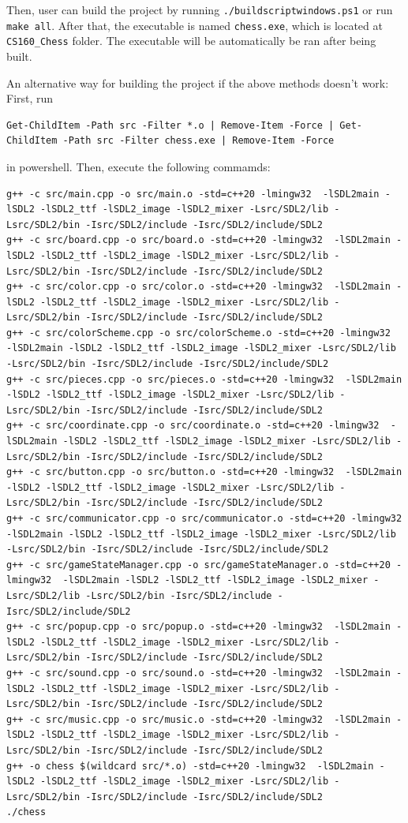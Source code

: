 \documentclass[a4paper, 10pt, titlepage]{report}
\begin{document}
Then, user can build the project by running \texttt{./buildscriptwindows.ps1} or run \texttt{make all}. After that, the executable is named \texttt{chess.exe}, which is located at \texttt{CS160\_Chess} folder. The executable will be automatically be ran after being built.

An alternative way for building the project if the above methods doesn't work:
First, run \begin{lstlisting}
Get-ChildItem -Path src -Filter *.o | Remove-Item -Force | Get-ChildItem -Path src -Filter chess.exe | Remove-Item -Force
\end{lstlisting} in powershell.
Then, execute the following commamds:
\begin{lstlisting}
g++ -c src/main.cpp -o src/main.o -std=c++20 -lmingw32  -lSDL2main -lSDL2 -lSDL2_ttf -lSDL2_image -lSDL2_mixer -Lsrc/SDL2/lib -Lsrc/SDL2/bin -Isrc/SDL2/include -Isrc/SDL2/include/SDL2
g++ -c src/board.cpp -o src/board.o -std=c++20 -lmingw32  -lSDL2main -lSDL2 -lSDL2_ttf -lSDL2_image -lSDL2_mixer -Lsrc/SDL2/lib -Lsrc/SDL2/bin -Isrc/SDL2/include -Isrc/SDL2/include/SDL2
g++ -c src/color.cpp -o src/color.o -std=c++20 -lmingw32  -lSDL2main -lSDL2 -lSDL2_ttf -lSDL2_image -lSDL2_mixer -Lsrc/SDL2/lib -Lsrc/SDL2/bin -Isrc/SDL2/include -Isrc/SDL2/include/SDL2
g++ -c src/colorScheme.cpp -o src/colorScheme.o -std=c++20 -lmingw32  -lSDL2main -lSDL2 -lSDL2_ttf -lSDL2_image -lSDL2_mixer -Lsrc/SDL2/lib -Lsrc/SDL2/bin -Isrc/SDL2/include -Isrc/SDL2/include/SDL2
g++ -c src/pieces.cpp -o src/pieces.o -std=c++20 -lmingw32  -lSDL2main -lSDL2 -lSDL2_ttf -lSDL2_image -lSDL2_mixer -Lsrc/SDL2/lib -Lsrc/SDL2/bin -Isrc/SDL2/include -Isrc/SDL2/include/SDL2
g++ -c src/coordinate.cpp -o src/coordinate.o -std=c++20 -lmingw32  -lSDL2main -lSDL2 -lSDL2_ttf -lSDL2_image -lSDL2_mixer -Lsrc/SDL2/lib -Lsrc/SDL2/bin -Isrc/SDL2/include -Isrc/SDL2/include/SDL2
g++ -c src/button.cpp -o src/button.o -std=c++20 -lmingw32  -lSDL2main -lSDL2 -lSDL2_ttf -lSDL2_image -lSDL2_mixer -Lsrc/SDL2/lib -Lsrc/SDL2/bin -Isrc/SDL2/include -Isrc/SDL2/include/SDL2
g++ -c src/communicator.cpp -o src/communicator.o -std=c++20 -lmingw32  -lSDL2main -lSDL2 -lSDL2_ttf -lSDL2_image -lSDL2_mixer -Lsrc/SDL2/lib -Lsrc/SDL2/bin -Isrc/SDL2/include -Isrc/SDL2/include/SDL2
g++ -c src/gameStateManager.cpp -o src/gameStateManager.o -std=c++20 -lmingw32  -lSDL2main -lSDL2 -lSDL2_ttf -lSDL2_image -lSDL2_mixer -Lsrc/SDL2/lib -Lsrc/SDL2/bin -Isrc/SDL2/include -Isrc/SDL2/include/SDL2
g++ -c src/popup.cpp -o src/popup.o -std=c++20 -lmingw32  -lSDL2main -lSDL2 -lSDL2_ttf -lSDL2_image -lSDL2_mixer -Lsrc/SDL2/lib -Lsrc/SDL2/bin -Isrc/SDL2/include -Isrc/SDL2/include/SDL2
g++ -c src/sound.cpp -o src/sound.o -std=c++20 -lmingw32  -lSDL2main -lSDL2 -lSDL2_ttf -lSDL2_image -lSDL2_mixer -Lsrc/SDL2/lib -Lsrc/SDL2/bin -Isrc/SDL2/include -Isrc/SDL2/include/SDL2
g++ -c src/music.cpp -o src/music.o -std=c++20 -lmingw32  -lSDL2main -lSDL2 -lSDL2_ttf -lSDL2_image -lSDL2_mixer -Lsrc/SDL2/lib -Lsrc/SDL2/bin -Isrc/SDL2/include -Isrc/SDL2/include/SDL2
g++ -o chess $(wildcard src/*.o) -std=c++20 -lmingw32  -lSDL2main -lSDL2 -lSDL2_ttf -lSDL2_image -lSDL2_mixer -Lsrc/SDL2/lib -Lsrc/SDL2/bin -Isrc/SDL2/include -Isrc/SDL2/include/SDL2
./chess
\end{lstlisting}
\end{document}
